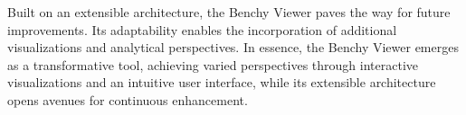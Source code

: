 Built on an extensible architecture, the Benchy Viewer paves the way for future improvements. Its adaptability enables the incorporation of additional visualizations and analytical perspectives. 
In essence, the Benchy Viewer emerges as a transformative tool, achieving varied perspectives through interactive visualizations and an intuitive user interface, while its extensible architecture opens avenues for continuous enhancement.






